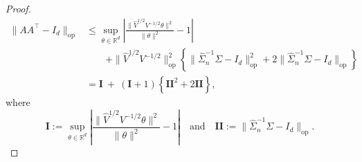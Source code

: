 \documentclass{article}
\begin{document}
\begin{appendices}
\begin{proof}
\begin{equation}
\begin{split}
 \|AA^{\top} - I_d\|_{\mathrm{op}} &\le \sup_{\theta\in\mathbb{R}^d}\left|\frac{\|\widehat{V}^{1/2}V^{-1/2}\theta\|^2}{\|\theta\|^2} - 1\right|\\ &\qquad+ \|\widehat{V}^{1/2}V^{-1/2}\|_{\mathrm{op}}^2\left\{\|\widehat{\Sigma}_n^{-1}\Sigma - I_d\|_{\mathrm{op}}^2 + 2\|\widehat{\Sigma}_n^{-1}\Sigma - I_d\|_{\mathrm{op}}\right\}\\
 &= \mathbf{I} ~+~ (\mathbf{I} + 1)\left\{\mathbf{II}^2 + 2\mathbf{II}\right\},
 \end{split}
 \end{equation}
 where
 \begin{equation}\label{eq:decomposition-sandwich-error}
 \mathbf{I} := \sup_{\theta\in\mathbb{R}^d}\left|\frac{\|\widehat{V}^{1/2}V^{-1/2}\theta\|^2}{\|\theta\|^2} - 1\right|\quad\mbox{and}\quad \mathbf{II} := \|\widehat{\Sigma}_n^{-1}\Sigma - I_d\|_{\mathrm{op}}.
 \end{equation}
 
 
 

\end{proof}
\end{appendices}
\end{document}
